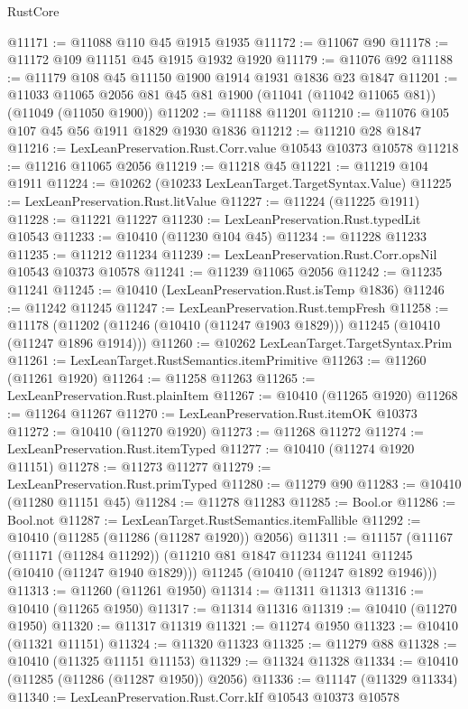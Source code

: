 \begin{lexlean}{RustCore}
\begin{coremodule}
@11171 := @11088 @110 @45 @1915 @1935
@11172 := @11067 @90
@11178 := @11172 @109 @11151 @45 @1915 @1932 @1920
@11179 := @11076 @92
@11188 := @11179 @108 @45 @11150 @1900 @1914 @1931 @1836 @23 @1847
@11201 := @11033 @11065 @2056 @81 @45 @81 @1900 (@11041 (@11042 @11065 @81)) (@11049 (@11050 @1900))
@11202 := @11188 @11201
@11210 := @11076 @105 @107 @45 @56 @1911 @1829 @1930 @1836
@11212 := @11210 @28 @1847
@11216 := LexLeanPreservation.Rust.Corr.value @10543 @10373 @10578
@11218 := @11216 @11065 @2056
@11219 := @11218 @45
@11221 := @11219 @104 @1911
@11224 := @10262 (@10233 LexLeanTarget.TargetSyntax.Value)
@11225 := LexLeanPreservation.Rust.litValue
@11227 := @11224 (@11225 @1911)
@11228 := @11221 @11227
@11230 := LexLeanPreservation.Rust.typedLit @10543
@11233 := @10410 (@11230 @104 @45)
@11234 := @11228 @11233
@11235 := @11212 @11234
@11239 := LexLeanPreservation.Rust.Corr.opsNil @10543 @10373 @10578
@11241 := @11239 @11065 @2056
@11242 := @11235 @11241
@11245 := @10410 (LexLeanPreservation.Rust.isTemp @1836)
@11246 := @11242 @11245
@11247 := LexLeanPreservation.Rust.tempFresh
@11258 := @11178
    (@11202 (@11246 (@10410 (@11247 @1903 @1829))) @11245 (@10410 (@11247 @1896 @1914)))
@11260 := @10262 LexLeanTarget.TargetSyntax.Prim
@11261 := LexLeanTarget.RustSemantics.itemPrimitive
@11263 := @11260 (@11261 @1920)
@11264 := @11258 @11263
@11265 := LexLeanPreservation.Rust.plainItem
@11267 := @10410 (@11265 @1920)
@11268 := @11264 @11267
@11270 := LexLeanPreservation.Rust.itemOK @10373
@11272 := @10410 (@11270 @1920)
@11273 := @11268 @11272
@11274 := LexLeanPreservation.Rust.itemTyped
@11277 := @10410 (@11274 @1920 @11151)
@11278 := @11273 @11277
@11279 := LexLeanPreservation.Rust.primTyped
@11280 := @11279 @90
@11283 := @10410 (@11280 @11151 @45)
@11284 := @11278 @11283
@11285 := Bool.or
@11286 := Bool.not
@11287 := LexLeanTarget.RustSemantics.itemFallible
@11292 := @10410 (@11285 (@11286 (@11287 @1920)) @2056)
@11311 := @11157
    (@11167
      (@11171 (@11284 @11292))
      (@11210 @81 @1847 @11234 @11241 @11245 (@10410 (@11247 @1940 @1829)))
      @11245
      (@10410 (@11247 @1892 @1946)))
@11313 := @11260 (@11261 @1950)
@11314 := @11311 @11313
@11316 := @10410 (@11265 @1950)
@11317 := @11314 @11316
@11319 := @10410 (@11270 @1950)
@11320 := @11317 @11319
@11321 := @11274 @1950
@11323 := @10410 (@11321 @11151)
@11324 := @11320 @11323
@11325 := @11279 @88
@11328 := @10410 (@11325 @11151 @11153)
@11329 := @11324 @11328
@11334 := @10410 (@11285 (@11286 (@11287 @1950)) @2056)
@11336 := @11147 (@11329 @11334)
@11340 := LexLeanPreservation.Rust.Corr.kIf @10543 @10373 @10578

\end{coremodule}
\end{lexlean}
